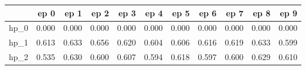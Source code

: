 \begin{tabular}{lrrrrrrrrrr}
\toprule
{} &   ep 0 &   ep 1 &   ep 2 &   ep 3 &   ep 4 &   ep 5 &   ep 6 &   ep 7 &   ep 8 &   ep 9 \\
\midrule
hp\_0 &  0.000 &  0.000 &  0.000 &  0.000 &  0.000 &  0.000 &  0.000 &  0.000 &  0.000 &  0.000 \\
hp\_1 &  0.613 &  0.633 &  0.656 &  0.620 &  0.604 &  0.606 &  0.616 &  0.619 &  0.633 &  0.599 \\
hp\_2 &  0.535 &  0.630 &  0.600 &  0.607 &  0.594 &  0.618 &  0.597 &  0.600 &  0.629 &  0.610 \\
\bottomrule
\end{tabular}
